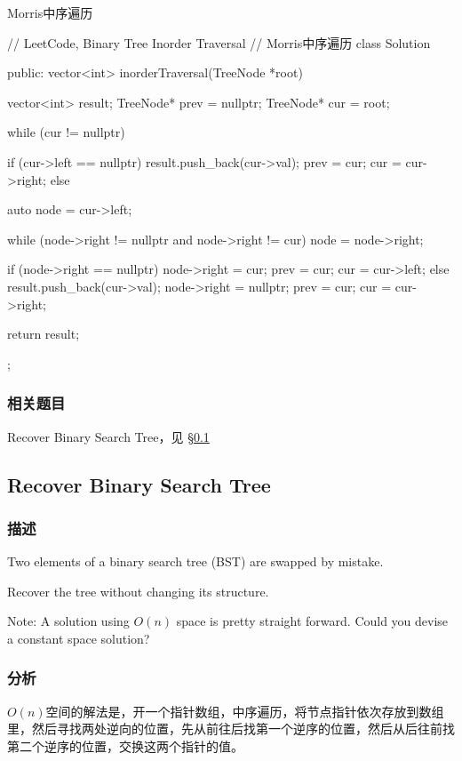 Morris中序遍历
\begin{Code}
// LeetCode, Binary Tree Inorder Traversal
// Morris中序遍历
class Solution {
public:
    vector<int> inorderTraversal(TreeNode *root) {
        vector<int> result;
        TreeNode* prev = nullptr;
        TreeNode* cur = root;

        while (cur != nullptr) {
            if (cur->left == nullptr) {
                result.push_back(cur->val);
                prev = cur;
                cur = cur->right;
            } else {
                auto node = cur->left;

                while (node->right != nullptr and node->right != cur)
                    node = node->right;

                if (node->right == nullptr) {
                    node->right = cur;
                    prev = cur;
                    cur = cur->left;
                } else {
                    result.push_back(cur->val);
                    node->right = nullptr;
                    prev = cur;
                    cur = cur->right;
                }
            }
        }
        return result;
    }
};
\end{Code}


\subsubsection{相关题目}
\begindot
\item Recover Binary Search Tree，见 \S \ref{sec:recover-binary-search-tree}
\myenddot


\subsection{Recover Binary Search Tree}
\label{sec:recover-binary-search-tree}


\subsubsection{描述}
Two elements of a binary search tree (BST) are swapped by mistake.

Recover the tree without changing its structure.

Note: A solution using $O(n)$ space is pretty straight forward. Could you devise a constant space solution?


\subsubsection{分析}
$O(n)$空间的解法是，开一个指针数组，中序遍历，将节点指针依次存放到数组里，然后寻找两处逆向的位置，先从前往后找第一个逆序的位置，然后从后往前找第二个逆序的位置，交换这两个指针的值。

